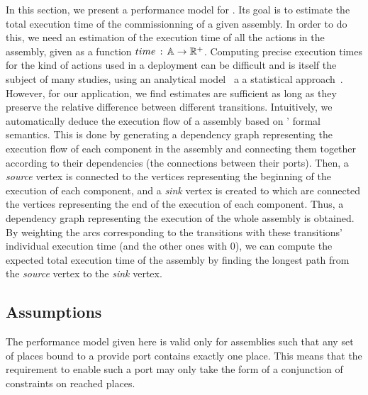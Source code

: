 In this section, we present a performance model for \mad. Its goal is to
estimate the total execution time of the commissionning of a
given assembly. In order to do this, we need an estimation of the
execution time of all the actions in the assembly, given as a
function $time\,:\,\mathbb{A}\rightarrow\mathbb{R}^+$.  Computing
precise execution times for the kind of actions used in a deployment
can be difficult and is itself the subject of many studies, \eg using
an analytical model~\cite{todo} a a statistical approach~\cite{todo}.
However, for our application, we find estimates are sufficient as long as
they preserve the relative difference between different transitions.
%
Intuitively, we automatically deduce the execution flow of a \mad
assembly based on \mad' formal semantics. This is done by generating a
dependency graph representing the execution flow of each \mad
component in the assembly and connecting them together according to their
dependencies (the connections between their ports). Then, a
\emph{source} vertex is connected to the vertices representing the beginning of
the execution of each component, and a \emph{sink} vertex is created to which
are connected the vertices representing the end of the execution of each
component.
%
Thus, a dependency graph representing the execution of the whole
assembly is obtained. By weighting the arcs corresponding to the transitions with
these transitions' individual execution time (and the other ones with 0),
we can compute the expected total execution time of the assembly by finding the
longest path from the \emph{source} vertex to the \emph{sink} vertex.



\subsection{Assumptions}

The performance model given here is valid only for assemblies such
that any set of places bound to a provide port contains exactly one
place. This means that the requirement to enable such a port may only
take the form of a conjunction of constraints on reached places.

